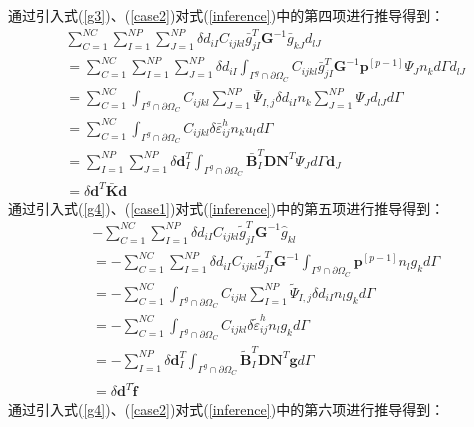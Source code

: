 通过引入式(\ref{g3})、(\ref{case2})对式(\ref{inference})中的第四项进行推导得到：
\begin{equation}\label{CH4-barK}
\begin{split}
    &\sum_{C=1}^{N\!C}\sum_{I=1}^{N\!P}\sum_{J=1}^{N\!P}\delta d_{iI}C_{ijkl}\bar{g}^T_{jI}\pmb{G}^{-1}\bar{g}_{kJ}d_{lJ}\\
    &=\sum_{C=1}^{N\!C}\sum_{I=1}^{N\!P}\sum_{J=1}^{N\!P}\delta d_{iI}\int_{\Gamma^g\cap\partial\Omega_C}C_{ijkl}\bar{g}_{jI}^T\pmb{G}^{-1}\pmb{p}^{[p-1]}\Psi_Jn_kd\Gamma d_{lJ}\\
    &=\sum_{C=1}^{N\!C}\int_{\Gamma^g\cap\partial\Omega_C}C_{ijkl}\sum_{J=1}^{N\!P}\bar{\Psi}_{I,j}\delta d_{iI}n_k\sum_{J=1}^{N\!P}\Psi_{J}d_{lJ}d\Gamma\\
    &=\sum_{C=1}^{N\!C}\int_{\Gamma^g\cap\partial\Omega_C}C_{ijkl}\delta\bar{\varepsilon}_{ij}^hn_ku_ld\Gamma\\
    &=\sum_{I=1}^{N\!P}\sum_{J=1}^{N\!P}\delta\pmb{d}_I^T\int_{\Gamma^g\cap\partial\Omega_C}\bar{\pmb{B}}_I^T\pmb{D}\pmb{N}^T\Psi_Jd\Gamma\pmb{d}_J\\
    &=\delta\pmb{d}^T\bar{\pmb{K}}\pmb{d}
\end{split}
\end{equation}
通过引入式(\ref{g4})、(\ref{case1})对式(\ref{inference})中的第五项进行推导得到：
\begin{equation}\label{CH4-tildef}
\begin{split}
    &-\sum_{C=1}^{N\!C}\sum_{I=1}^{N\!P}\delta d_{iI}C_{ijkl}\tilde{g}^T_{jI}\pmb{G}^{-1}\hat{g}_{kl}\\
    &=-\sum_{C=1}^{N\!C}\sum_{I=1}^{N\!P}\delta d_{iI}C_{ijkl}\tilde{g}^T_{jI}\pmb{G}^{-1}\int_{\Gamma^g\cap\partial\Omega_C}\pmb{p}^{[p-1]}n_lg_kd\Gamma\\
    &=-\sum_{C=1}^{N\!C}\int_{\Gamma^g\cap\partial\Omega_C}C_{ijkl}\sum_{I=1}^{N\!P}\tilde{\Psi}_{I,j}\delta d_{iI}n_lg_kd\Gamma\\
    &=-\sum_{C=1}^{N\!C}\int_{\Gamma^g\cap\partial\Omega_C}C_{ijkl}\delta\tilde{\varepsilon}_{ij}^hn_lg_kd\Gamma\\
    &=-\sum_{I=1}^{N\!P}\delta\pmb{d}_I^T\int_{\Gamma^g\cap\partial\Omega_C}\tilde{\pmb{B}}_I^T\pmb{D}\pmb{N}^T\pmb{g}d\Gamma\\
    &=\delta\pmb{d}^T\tilde{\pmb f}
\end{split}
\end{equation}
通过引入式(\ref{g4})、(\ref{case2})对式(\ref{inference})中的第六项进行推导得到：
